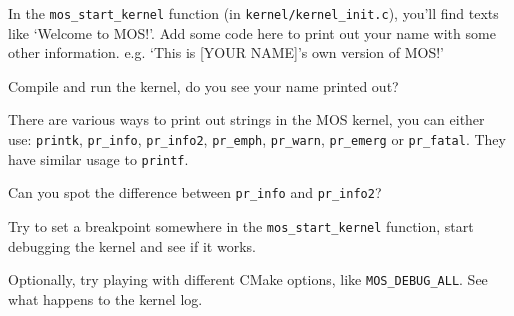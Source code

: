 \begin{exercise}
    \item In the \texttt{mos\_start\_kernel} function (in \texttt{kernel/kernel\_init.c}), you'll find
    texts like `Welcome to MOS!'. Add some code here to print out your name with some other information.
    e.g. `This is [YOUR NAME]'s own version of MOS!'

    Compile and run the kernel, do you see your name printed out?

    \begin{tip}
        \item There are various ways to print out strings in the MOS kernel, you can either use:
        \texttt{printk}, \texttt{pr\_info}, \texttt{pr\_info2}, \texttt{pr\_emph}, \texttt{pr\_warn},
        \texttt{pr\_emerg} or \texttt{pr\_fatal}. They have similar usage to \texttt{printf}.
        \item Can you spot the difference between \texttt{pr\_info} and \texttt{pr\_info2}?
    \end{tip}

    \item Try to set a breakpoint somewhere in the \texttt{mos\_start\_kernel} function, start debugging
    the kernel and see if it works.

    \item Optionally, try playing with different CMake options, like \texttt{MOS\_DEBUG\_ALL}. See what happens to the
    kernel log.
\end{exercise}
